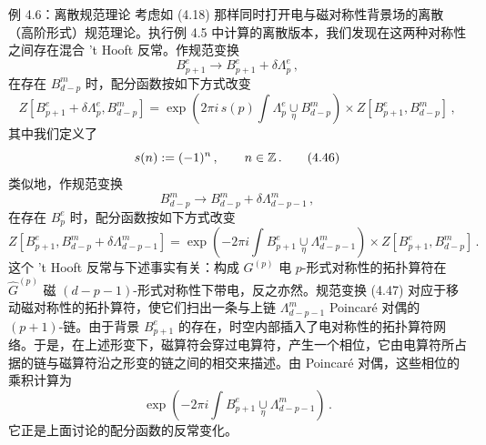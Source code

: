 \begin{examplebox}{例 4.6：离散规范理论}
考虑如 (4.18) 那样同时打开电与磁对称性背景场的离散（高阶形式）规范理论。执行例 4.5 中计算的离散版本，我们发现在这两种对称性之间存在混合 't Hooft 反常。作规范变换
\begin{equation}
  B^e_{p+1}\to B^e_{p+1}+\delta\Lambda^e_p\,, \tag{4.44}
\end{equation}
在存在 $B^m_{d-p}$ 时，配分函数按如下方式改变
\begin{equation}
  Z\left[B^e_{p+1}+\delta\Lambda^e_p,B^m_{d-p}\right]=\exp\left(2\pi i\,s(p)\int\Lambda^e_p\underset{\eta}{\cup}B^m_{d-p}\right)\times Z\left[B^e_{p+1},B^m_{d-p}\right]\,, \tag{4.45}
\end{equation}
其中我们定义了
\begin{equation}
  s(n):=(-1)^n\,,\qquad n\in\mathbb{Z}\,. \tag{4.46}
\end{equation}
类似地，作规范变换
\begin{equation}
  B^m_{d-p}\to B^m_{d-p}+\delta\Lambda^m_{d-p-1}\,, \tag{4.47}
\end{equation}
在存在 $B^e_p$ 时，配分函数按如下方式改变
\begin{equation}
  Z\left[B^e_{p+1},B^m_{d-p}+\delta\Lambda^m_{d-p-1}\right]=\exp\left(-2\pi i\int B^e_{p+1}\underset{\eta}{\cup}\Lambda^m_{d-p-1}\right)\times Z\left[B^e_{p+1},B^m_{d-p}\right]\,. \tag{4.48}
\end{equation}
这个 't Hooft 反常与下述事实有关：构成 $G^{(p)}$ 电 $p$-形式对称性的拓扑算符在 $\widehat{G}^{(p)}$ 磁 $(d-p-1)$-形式对称性下带电，反之亦然。规范变换 (4.47) 对应于移动磁对称性的拓扑算符，使它们扫出一条与上链 $\Lambda^m_{d-p-1}$ Poincaré 对偶的 $(p+1)$-链。由于背景 $B^e_{p+1}$ 的存在，时空内部插入了电对称性的拓扑算符网络。于是，在上述形变下，磁算符会穿过电算符，产生一个相位，它由电算符所占据的链与磁算符沿之形变的链之间的相交来描述。由 Poincaré 对偶，这些相位的乘积计算为
\begin{equation}
  \exp\left(-2\pi i\int B^e_{p+1}\underset{\eta}{\cup}\Lambda^m_{d-p-1}\right)\,. \tag{4.49}
\end{equation}
它正是上面讨论的配分函数的反常变化。
\end{examplebox}



